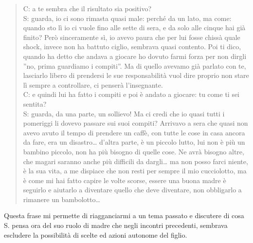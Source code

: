 \begin{verse}
C: a te sembra che il risultato sia positivo?\\
S: guarda, io ci sono rimasta quasi male: perché da un lato, ma come: quando sto lì io ci vuole fino alle sette di sera, e da solo alle cinque hai già finito? Però sinceramente sì, io avevo paura che per lui fosse chissà quale shock, invece non ha battuto ciglio, sembrava quasi contento. Poi ti dico, quando ha detto che andava a giocare ho dovuto farmi forza per non dirgli  ''no, prima guardiamo i compiti''. Ma di quello avevamo già parlato con te, lasciarlo libero di prendersi le sue responsabilità vuol dire proprio non stare lì sempre a controllare, ci penserà l'insegnante.\\
C: e quindi lui ha fatto i compiti e poi è andato a giocare: tu come ti sei sentita?\\
S: guarda, da una parte, un sollievo! Ma ci credi che io quasi tutti i pomeriggi li dovevo passare sui suoi compiti? Arrivavo a sera che quasi non avevo avuto il tempo di prendere un caffè, con tutte le cose in casa ancora da fare, era un disastro\ldots{} d'altra parte, è un piccolo lutto, lui non è più un bambino piccolo, non ha più bisogno di quelle cose. Ne avrà bisogno altre, che magari saranno anche più difficili da dargli\ldots{} ma non posso farci niente, è la sua vita, a me dispiace che non resti per sempre il mio cucciolotto, ma è come mi hai fatto capire le volte scorse, essere una buona madre è seguirlo e aiutarlo a diventare quello che deve diventare, non obbligarlo a rimanere un bambolotto\ldots{}\\
\end{verse}

\noindent Questa frase mi permette di riagganciarmi a un tema passato e discutere di cosa S. pensa ora del suo ruolo di madre che negli incontri precedenti, sembrava escludere la possibilità di scelte ed azioni autonome del figlio.

